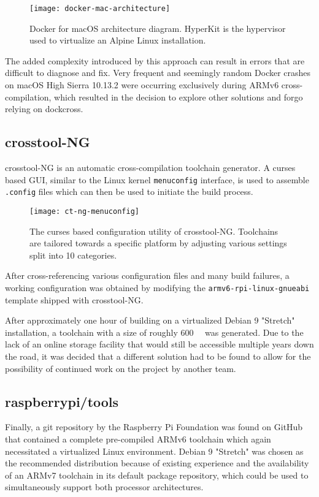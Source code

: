 \begin{figure}[H]
\centering

\texttt{[image: docker-mac-architecture]}
\caption{Docker for macOS architecture diagram. HyperKit is the hypervisor used to virtualize an Alpine Linux installation.}
\end{figure}

The added complexity introduced by this approach can result in errors that are difficult to diagnose and fix. Very frequent and seemingly random Docker crashes on macOS High Sierra 10.13.2 were occurring exclusively during ARMv6 cross-compilation, which resulted in the decision to explore other solutions and forgo relying on dockcross. 

\subsection{crosstool-NG}
crosstool-NG \cite{crosstool-ng} is an automatic cross-compilation toolchain generator. A curses based GUI, similar to the Linux kernel \texttt{menuconfig} interface, is used to assemble \texttt{.config} files which can then be used to initiate the build process. 

\begin{figure}[H]
\centering

\texttt{[image: ct-ng-menuconfig]}
\caption{The curses based configuration utility of crosstool-NG. Toolchains are tailored towards a specific platform by adjusting various settings split into 10 categories.}
\end{figure}

After cross-referencing various configuration files and many build failures, a working configuration was obtained by modifying the \texttt{armv6-rpi-linux-gnueabi} template shipped with crosstool-NG.

After approximately one hour of building on a virtualized Debian 9 "Stretch" installation, a toolchain with a size of roughly \SI{600}{\mega\byte} was generated. Due to the lack of an online storage facility that would still be accessible multiple years down the road, it was decided that a different solution had to be found to allow for the possibility of continued work on the project by another team.

\subsection{raspberrypi/tools}
Finally, a git repository by the Raspberry Pi Foundation was found on GitHub \cite{raspberrypi-tools} that contained a complete pre-compiled ARMv6 toolchain which again necessitated a virtualized Linux environment. Debian 9 "Stretch" was chosen as the recommended distribution because of existing experience and the availability of an ARMv7 toolchain in its default package repository, which could be used to simultaneously support both processor architectures. 

